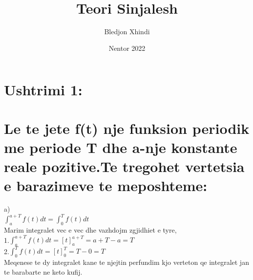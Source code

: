 \documentclass{article}
\title{Teori Sinjalesh}
\author{Bledjon Xhindi}
\date{Nentor 2022}
\begin{document}
\maketitle

\section*{Ushtrimi 1:}
\section*{Le te jete f(t) nje funksion periodik me periode T dhe a-nje konstante reale pozitive.Te tregohet vertetsia e barazimeve te meposhteme:}

a)\\

$\int_{a}^{a+T} f(t) dt = \int_{0}^{T} f(t) dt$\\

Marim integralet vec e vec dhe vazhdojm zgjidhiet e tyre,\\

1.$\int_{a}^{a+T} f(t) dt = [t]_{a}^{a+T} = a + T - a = T$\\

2.$\int_{0}^{T} f(t) dt = [t]_{0}^{T} = T - 0 = T$\\

Meqenese te dy integralet kane te njejtin perfundim kjo verteton qe integralet jan te barabarte ne keto kufij.
\end{document}
